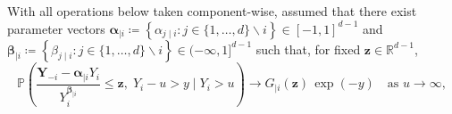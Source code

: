 \documentclass[12pt,compact]{article}
\DeclareMathOperator{\CE}{\mathrm{CE}}
\begin{document}
With all operations below taken component-wise, \citet{Heffernan2004} assumed that there exist parameter vectors $\symbf{\alpha}_{\mid i} \coloneqq \left\{\alpha_{j \mid i} : j\in\{1,\dots,d\}\backslash i \right\} \in [-1, 1]^{d-1}$ and $\symbf{\beta}_{\mid i} \coloneqq \left\{\beta_{j \mid i} : j\in\{1,\dots,d\}\backslash i \right\} \in (-\infty, 1]^{d-1}$ such that, for fixed $\symbf{z} \in \mathbb{R}^{d-1}$, %
\begin{equation}\label{eq:ce_limiting_dist}
  \mathbb{P}\!\left(
  \frac{\symbf{Y}_{-i} - \symbf{\alpha}_{\mid i} Y_{i}}
  {Y_{i}^{\symbf{\beta}_{\mid i}}}
  \le \symbf{z},\; 
  Y_i - u > y \;\Big|\; Y_i > u
  \right)
  \longrightarrow
  G_{\mid i}(\symbf{z})\,\exp{(-y)}
  \quad\text{as } u \to \infty,
\end{equation}
\end{document}

